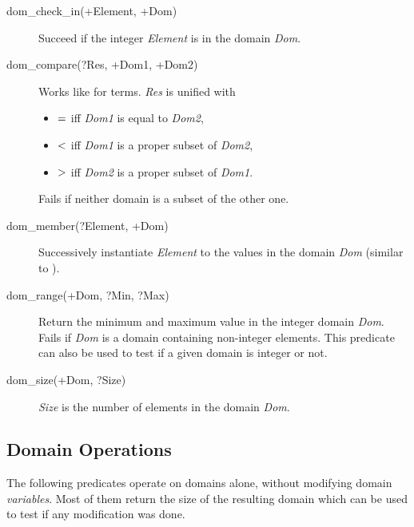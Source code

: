 \begin{description}
\item[dom_check_in(+Element, +Dom)]
Succeed if the integer {\it Element} is in the domain {\it Dom}.

\item[dom_compare(?Res, +Dom1, +Dom2)]
Works like  for terms.
{\it Res} is unified with
\begin{itemize}
\item ${\bf =}$
iff {\it Dom1} is equal to {\it Dom2},
\item ${\bf <}$
iff {\it Dom1} is a proper subset of {\it Dom2},
\item ${\bf >}$
iff {\it Dom2} is a proper subset of {\it Dom1}.
\end{itemize}
Fails if neither domain is a subset of the other one.

\item[dom_member(?Element, +Dom)]
Successively instantiate {\it Element} to the values in the domain {\it Dom}
(similar to ).

\item[dom_range(+Dom, ?Min, ?Max)]
Return the minimum and maximum value  in the integer domain {\it Dom}.
Fails if {\it Dom} is a domain containing non-integer 
elements.
This predicate can also be used to test if a given domain
is integer or not.

\item[dom_size(+Dom, ?Size)]
{\it Size} is the number of elements in the domain {\it Dom}.

\end{description}

\subsection{Domain Operations}
\label{dommodify}
The following predicates operate on domains alone, without modifying
domain {\it variables}.
Most of them return the size of the resulting domain which can be used
to test if any modification was done.

